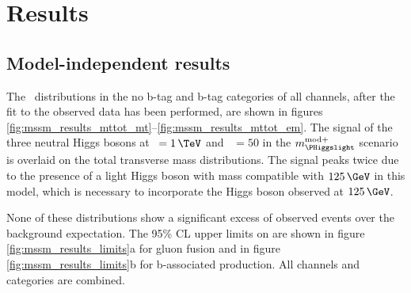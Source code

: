 \section{Results}
\label{sec:mssm_results}
\subsection{Model-independent results}
\label{sec:mssm_results_modelindep}
The \mTtot~distributions in the no b-tag and b-tag
categories of all channels, after the fit to the observed
data has been performed, are shown in figures \ref{fig:mssm_results_mttot_mt}--\ref{fig:mssm_results_mttot_em}.
The signal of the three neutral Higgs bosons at \mA~$=1\,\TeV$ and \tanb~$=50$ in the $m_{\PHiggslight}^{\text{mod+}}$ scenario is overlaid 
on the total transverse mass distributions. The signal peaks twice due to the presence of a light Higgs boson
with mass compatible with $125\,\GeV$ in this model, which is necessary to incorporate the Higgs boson
observed at $125\,\GeV$.

None of these distributions show a significant excess of observed events over the background
expectation. The
95\% \ac{CL} upper limits on \xsbr are shown in figure \ref{fig:mssm_results_limits}a
for gluon fusion and in figure \ref{fig:mssm_results_limits}b for b-associated
production. All channels and categories are combined. 

